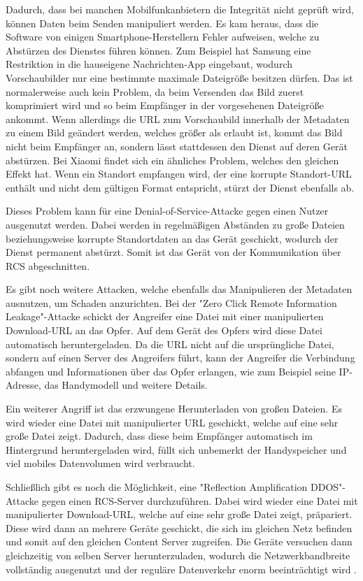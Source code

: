 \documentclass[conference]{IEEEtran}
\begin{document}
Dadurch, dass bei manchen Mobilfunkanbietern die Integrität nicht geprüft wird, können Daten beim Senden manipuliert werden.
Es kam heraus, dass die Software von einigen Smartphone-Herstellern Fehler aufweisen, welche zu Abstürzen des Dienstes führen können.
Zum Beispiel hat Samsung eine Restriktion in die hauseigene Nachrichten-App eingebaut, wodurch Vorschaubilder nur eine bestimmte maximale Dateigröße besitzen dürfen.
Das ist normalerweise auch kein Problem, da beim Versenden das Bild zuerst komprimiert wird und so beim Empfänger in der vorgesehenen Dateigröße ankommt.
Wenn allerdings die URL zum Vorschaubild innerhalb der Metadaten zu einem Bild geändert werden, welches größer als erlaubt ist, kommt das Bild nicht beim Empfänger an, sondern lässt stattdessen den Dienst auf deren Gerät abstürzen.
Bei Xiaomi findet sich ein ähnliches Problem, welches den gleichen Effekt hat.
Wenn ein Standort empfangen wird, der eine korrupte Standort-URL enthält und nicht dem gültigen Format entspricht, stürzt der Dienst ebenfalls ab.

Dieses Problem kann für eine Denial-of-Service-Attacke gegen einen Nutzer ausgenutzt werden.
Dabei werden in regelmäßigen Abständen zu große Dateien beziehungsweise korrupte Standortdaten an das Gerät geschickt, wodurch der Dienst permanent abstürzt.
Somit ist das Gerät von der Kommunikation über RCS abgeschnitten.

Es gibt noch weitere Attacken, welche ebenfalls das Manipulieren der Metadaten ausnutzen, um Schaden anzurichten.
Bei der "Zero Click Remote Information Leakage"-Attacke schickt der Angreifer eine Datei mit einer manipulierten Download-URL an das Opfer.
Auf dem Gerät des Opfers wird diese Datei automatisch heruntergeladen.
Da die URL nicht auf die ursprüngliche Datei, sondern auf einen Server des Angreifers führt, kann der Angreifer die Verbindung abfangen und Informationen über das Opfer erlangen, wie zum Beispiel seine IP-Adresse, das Handymodell und weitere Details.

Ein weiterer Angriff ist das erzwungene Herunterladen von großen Dateien.
Es wird wieder eine Datei mit manipulierter URL geschickt, welche auf eine sehr große Datei zeigt.
Dadurch, dass diese beim Empfänger automatisch im Hintergrund heruntergeladen wird, füllt sich unbemerkt der Handyspeicher und viel mobiles Datenvolumen wird verbraucht.

Schließlich gibt es noch die Möglichkeit, eine "Reflection Amplification DDOS"-Attacke gegen einen RCS-Server durchzuführen.
Dabei wird wieder eine Datei mit manipulierter Download-URL, welche auf eine sehr große Datei zeigt, präpariert.
Diese wird dann an mehrere Geräte geschickt, die sich im gleichen Netz befinden und somit auf den gleichen Content Server zugreifen.
Die Geräte versuchen dann gleichzeitig von selben Server herunterzuladen, wodurch die Netzwerkbandbreite vollständig ausgenutzt und der reguläre Datenverkehr enorm beeinträchtigt wird \cite{uncoversec}.
\end{document}
